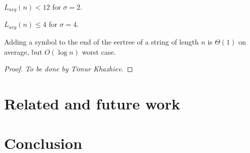 \begin{corollary}
  $L_{avg}(n) < 12$ for $\sigma = 2$.
\end{corollary}

\begin{corollary}
  $L_{avg}(n) \le 4$ for $\sigma = 4$.
\end{corollary}

\begin{theorem}
  Adding a symbol to the end of the eertree of
  a string of length $n$ is $\Theta(1)$ on average,
  but $O(\log{}n)$ worst case.
\end{theorem}
\begin{proof}
  \emph{To be done by Timur Khazhiev.}
\end{proof}

\section{Related and future work}

\section{Conclusion}

